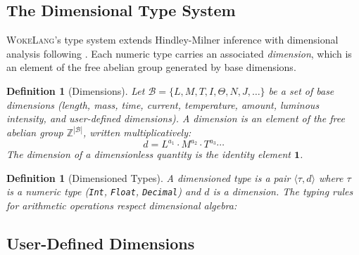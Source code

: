 \documentclass[11pt,a4paper]{article}
\newtheorem{definition}[theorem]{Definition}
\newcommand{\unitty}[1]{\langle #1 \rangle}
\newcommand{\WokeLang}{\textsc{WokeLang}}
\begin{document}
\subsection{The Dimensional Type System}

\WokeLang{}'s type system extends Hindley-Milner inference with
dimensional analysis following \citet{kennedy1997relational}.  Each
numeric type carries an associated \emph{dimension}, which is an
element of the free abelian group generated by base dimensions.

\begin{definition}[Dimensions]
\label{def:dimensions}
Let $\mathcal{B} = \{L, M, T, I, \Theta, N, J, \ldots\}$ be a set of
base dimensions (length, mass, time, current, temperature, amount,
luminous intensity, and user-defined dimensions).  A \emph{dimension}
is an element of the free abelian group $\mathbb{Z}^{|\mathcal{B}|}$,
written multiplicatively:
\[
  d = L^{a_1} \cdot M^{a_2} \cdot T^{a_3} \cdots
\]
The dimension of a dimensionless quantity is the identity element
$\mathbf{1}$.
\end{definition}

\begin{definition}[Dimensioned Types]
\label{def:dim-types}
A \emph{dimensioned type} is a pair $\unitty{\tau, d}$ where $\tau$
is a numeric type (\texttt{Int}, \texttt{Float}, \texttt{Decimal})
and $d$ is a dimension.  The typing rules for arithmetic operations
respect dimensional algebra:
\end{definition}

\subsection{User-Defined Dimensions}
\end{document}
